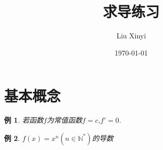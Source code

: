 \documentclass{article}
\title{求导练习}
\author{Liu Xinyi}
\date{\today}
\newtheorem{example}{例}[section]
\begin{document}
\maketitle
\section{基本概念}

\begin{example}
    若函数$f$为常值函数$f=c$,$f'=0$.\\
\end{example}
\vspace*{40pt}

\begin{example}
    $f(x)=x^n(n\in \mathbb{N}^*)$的导数
\end{example}
\vspace*{40pt}
\end{document}
